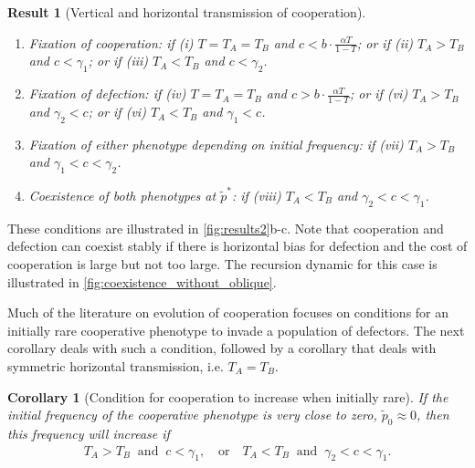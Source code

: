 \documentclass[12pt]{extarticle}
\newtheorem{corollary}{Corollary}
\newtheorem{result}{Result}
\begin{document}
{\begin{result}[Vertical and horizontal transmission of cooperation]
\begin{enumerate} %
\item \emph{Fixation of cooperation}:
	if \emph{(i)} $T=T_A=T_B$ and $c < b \cdot \frac{\alpha T}{1-T}$; or
	if \emph{(ii)} $T_A>T_B$ and $c<\gamma_1$; or
	if \emph{(iii)} $T_A<T_B$ and $c<\gamma_2$.
\item \emph{Fixation of defection}:
	if \emph{(iv)} $T=T_A=T_B$ and $c > b \cdot \frac{\alpha T}{1-T}$; or
	if \emph{(vi)} $T_A>T_B$ and $\gamma_2<c$; or
	if \emph{(vi)} $T_A<T_B$ and $\gamma_1<c$.
\item \emph{Fixation of either phenotype depending on initial frequency}: 
	if \emph{(vii)} $T_A>T_B$ and $\gamma_1<c<\gamma_2$.
\item \emph{Coexistence of both phenotypes at $\tilde{p}^*$}:
	if \emph{(viii)} $T_A<T_B$ and $\gamma_2<c<\gamma_1$.
\end{enumerate}
\end{result}

These conditions are illustrated in \autoref{fig:results2}b-c.
Note that cooperation and defection can coexist stably if there is horizontal bias for defection and the cost of cooperation is large but not too large. The recursion dynamic for this case is illustrated in \autoref{fig:coexistence_without_oblique}.

Much of the literature on evolution of cooperation focuses on conditions for an initially rare cooperative phenotype to invade a population of defectors.
The next corollary deals with such a condition, followed by a corollary that deals with symmetric horizontal transmission, i.e. $T_A=T_B$.
\\

\begin{corollary}[Condition for cooperation to increase when initially rare]
If the initial frequency of the cooperative phenotype is very close to zero, $\tilde{p}_0 \approx 0$, then this frequency will increase if 
\begin{equation} \label{eq:unequal_transmission_from_rarity}
\begin{aligned}
T_A>T_B \;\; \text{and} \;\; c < \gamma_1, \quad \text{or} \quad
T_A<T_B \;\; \text{and} \;\; \gamma_2<c < \gamma_1. 
\end{aligned}
\end{equation} 
\end{corollary}

}
\end{document}
